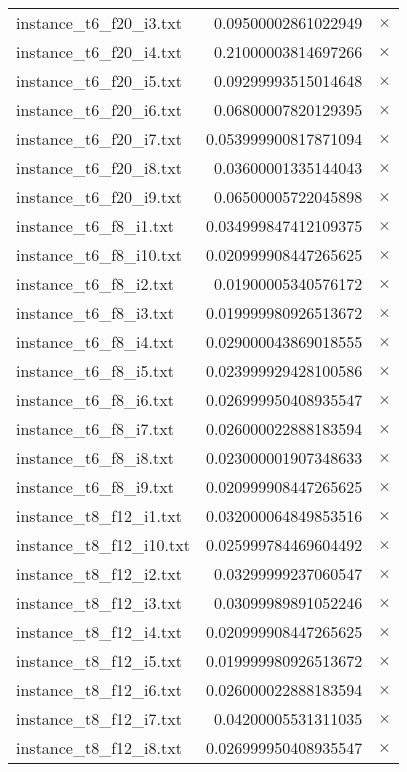 \documentclass{article}
\begin{document}
\begin{center}
\begin{tabular}{|l|rr|}
instance\_t6\_f20\_i3.txt & 0.09500002861022949 & $\times$ \\
instance\_t6\_f20\_i4.txt & 0.21000003814697266 & $\times$ \\
instance\_t6\_f20\_i5.txt & 0.09299993515014648 & $\times$ \\
instance\_t6\_f20\_i6.txt & 0.06800007820129395 & $\times$ \\
instance\_t6\_f20\_i7.txt & 0.053999900817871094 & $\times$ \\
instance\_t6\_f20\_i8.txt & 0.03600001335144043 & $\times$ \\
instance\_t6\_f20\_i9.txt & 0.06500005722045898 & $\times$ \\
instance\_t6\_f8\_i1.txt & 0.034999847412109375 & $\times$ \\
instance\_t6\_f8\_i10.txt & 0.020999908447265625 & $\times$ \\
instance\_t6\_f8\_i2.txt & 0.01900005340576172 & $\times$ \\
instance\_t6\_f8\_i3.txt & 0.019999980926513672 & $\times$ \\
instance\_t6\_f8\_i4.txt & 0.029000043869018555 & $\times$ \\
instance\_t6\_f8\_i5.txt & 0.023999929428100586 & $\times$ \\
instance\_t6\_f8\_i6.txt & 0.026999950408935547 & $\times$ \\
instance\_t6\_f8\_i7.txt & 0.026000022888183594 & $\times$ \\
instance\_t6\_f8\_i8.txt & 0.023000001907348633 & $\times$ \\
instance\_t6\_f8\_i9.txt & 0.020999908447265625 & $\times$ \\
instance\_t8\_f12\_i1.txt & 0.032000064849853516 & $\times$ \\
instance\_t8\_f12\_i10.txt & 0.025999784469604492 & $\times$ \\
instance\_t8\_f12\_i2.txt & 0.03299999237060547 & $\times$ \\
instance\_t8\_f12\_i3.txt & 0.03099989891052246 & $\times$ \\
instance\_t8\_f12\_i4.txt & 0.020999908447265625 & $\times$ \\
instance\_t8\_f12\_i5.txt & 0.019999980926513672 & $\times$ \\
instance\_t8\_f12\_i6.txt & 0.026000022888183594 & $\times$ \\
instance\_t8\_f12\_i7.txt & 0.04200005531311035 & $\times$ \\
instance\_t8\_f12\_i8.txt & 0.026999950408935547 & $\times$ \\

\end{tabular}
\end{center}
\end{document}

